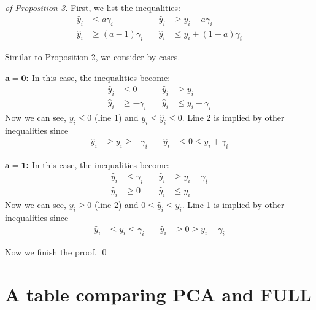 \begin{proof}[of Proposition 3] First, we list the inequalities: \begin{align*}
		\hat{y}_i &\leq a \gamma_i               &\quad \hat{y}_i &\geq y_i - a \gamma_i \\
		\hat{y}_i &\geq (a-1) \gamma_i           &\quad \hat{y}_i &\leq y_i + (1-a) \gamma_i
	\end{align*}
	
	Similar to Proposition 2, we consider by cases.
	
	\textbf{$\mathbf{a = 0}$:} In this case, the inequalities become: \begin{align*}
		\hat{y}_i &\leq 0               &\quad \hat{y}_i &\geq y_i \\
		\hat{y}_i &\geq -\gamma_i           &\quad \hat{y}_i &\leq y_i + \gamma_i
	\end{align*} Now we can see, $y_i\leq 0$ (line 1) and $y_i\leq\hat{y}_i\leq 0 $. Line 2 is implied by other inequalities since \begin{align*}
	\hat{y}_i &\geq y_i \geq -\gamma_i           &\quad \hat{y}_i &\leq 0 \leq y_i + \gamma_i
	\end{align*}

	\textbf{$\mathbf{a = 1}$:} In this case, the inequalities become: \begin{align*}
		\hat{y}_i &\leq \gamma_i               &\quad \hat{y}_i &\geq y_i - \gamma_i \\
		\hat{y}_i &\geq 0           &\quad \hat{y}_i &\leq y_i 
	\end{align*} Now we can see, $y_i\geq 0$ (line 2) and $0\leq\hat{y}_i\leq y_i $. Line 1 is implied by other inequalities since \begin{align*}
	\hat{y}_i &\leq y_i\leq \gamma_i               &\quad \hat{y}_i &\geq 0 \geq y_i - \gamma_i 
	\end{align*}
		
Now we finish the proof. \qed
\end{proof}


\section{A table comparing PCA and FULL}



